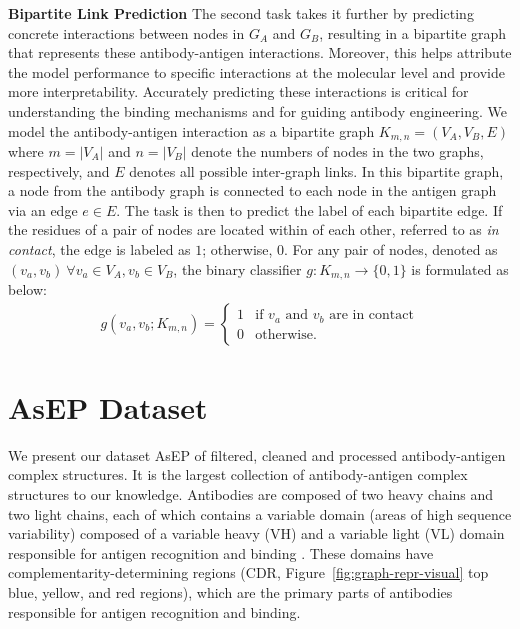 \documentclass[11pt]{article}
\begin{document}
\textbf{Bipartite Link Prediction} The second task takes it further by predicting concrete interactions between nodes in $ G_A $ and $ G_B $, resulting in a bipartite graph that represents these antibody-antigen interactions.
Moreover, this helps attribute the model performance to specific interactions at the molecular level and provide more interpretability.
Accurately predicting these interactions is critical for understanding the binding mechanisms and for guiding antibody engineering.
We model the antibody-antigen interaction as a bipartite graph
$
  K_{m,n} = (V_A, V_B, E)
$
where $m = |V_A|$ and $n = |V_B|$ denote the numbers of nodes in the two graphs, respectively, and $E$ denotes all possible inter-graph links.
In this bipartite graph, a node from the antibody graph is connected to each node in the antigen graph via an edge $e \in E$.
The task is then to predict the label of each bipartite edge.
If the residues of a pair of nodes are located within  of each other, referred to as \textit{in contact}, the edge is labeled as $1$; otherwise, $0$.
For any pair of nodes, denoted as $(v_a, v_b) \ \forall v_a \in V_A, v_b \in V_B$, the binary classifier $ g: K_{m,n} \rightarrow \{0, 1\} $ is formulated as below:
\begin{align}
  g(v_a, v_b; K_{m,n}) =
  \begin{cases}
    1 & \text{if $v_a$ and $v_b$ are in contact} \\
    0 & \text{otherwise}.
  \end{cases}
\end{align}



\section{AsEP Dataset}
We present our dataset AsEP of filtered, cleaned and processed antibody-antigen complex structures. It is the largest collection of antibody-antigen complex structures to our knowledge.
Antibodies are composed of two heavy chains and two light chains, each of which contains a variable domain (areas of high sequence variability) composed of a variable heavy (VH) and a variable light (VL) domain responsible for antigen recognition and binding \citep{chothia-ab-struct}. These domains have complementarity-determining regions (CDR, Figure~\ref{fig:graph-repr-visual} top {\color{blue}blue}, {\color{dandelion}yellow}, and {\color{red}red} regions), which are the primary parts of antibodies responsible for antigen recognition and binding.
\end{document}
